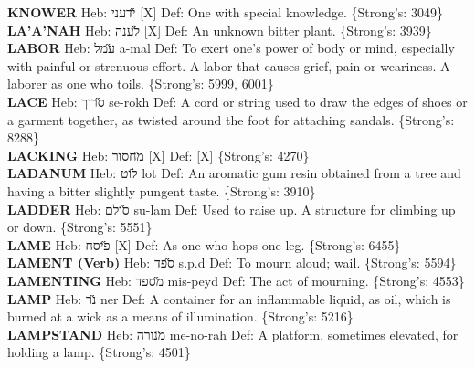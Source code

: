 {\textbf{KNOWER} Heb: {\large\H ידעני} {[}X{]} Def: One with special knowledge. \{Strong's: 3049\}\hfill{}\\

\textbf{LA'A'NAH} Heb: {\large\H לענה} {[}X{]} Def: An unknown bitter plant. \{Strong's: 3939\}\hfill{}\\

\textbf{LABOR} Heb: {\large\H עמל} a-mal Def: To exert one’s power of body or mind, especially with painful or strenuous effort. A labor that causes grief, pain or weariness. A laborer as one who toils. \{Strong's: 5999, 6001\}\hfill{}\\

\textbf{LACE} Heb: {\large\H סרוך} se-rokh Def: A cord or string used to draw the edges of shoes or a garment together, as twisted around the foot for attaching sandals. \{Strong's: 8288\}\hfill{}\\

\textbf{LACKING} Heb: {\large\H מחסור} {[}X{]} Def: {[}X{]} \{Strong's: 4270\}\hfill{}\\

\textbf{LADANUM} Heb: {\large\H לוט} lot Def: An aromatic gum resin obtained from a tree and having a bitter slightly pungent taste. \{Strong's: 3910\}\hfill{}\\

\textbf{LADDER} Heb: {\large\H סולם} su-lam Def: Used to raise up. A structure for climbing up or down. \{Strong's: 5551\}\hfill{}\\

\textbf{LAME} Heb: {\large\H פיסח} {[}X{]} Def: As one who hops one leg. \{Strong's: 6455\}\hfill{}\\

\textbf{LAMENT (Verb)} Heb: {\large\H ספד} s.p.d Def: To mourn aloud; wail. \{Strong's: 5594\}\hfill{}\\

\textbf{LAMENTING} Heb: {\large\H מספד} mis-peyd Def: The act of mourning. \{Strong's: 4553\}\hfill{}\\

\textbf{LAMP} Heb: {\large\H נר} ner Def: A container for an inflammable liquid, as oil, which is burned at a wick as a means of illumination. \{Strong's: 5216\}\hfill{}\\

\textbf{LAMPSTAND} Heb: {\large\H מנורה} me-no-rah Def: A platform, sometimes elevated, for holding a lamp. \{Strong's: 4501\}\hfill{}\\

}

